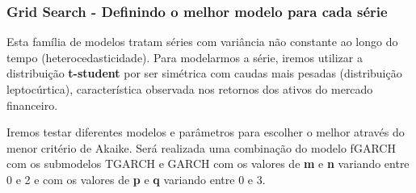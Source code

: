 \documentclass[
]{article}
\begin{document}
\hypertarget{grid-search---definindo-o-melhor-modelo-para-cada-suxe9rie}{%
\subsubsection{Grid Search - Definindo o melhor modelo para cada
série}\label{grid-search---definindo-o-melhor-modelo-para-cada-suxe9rie}}

Esta família de modelos tratam séries com variância não constante ao
longo do tempo (heterocedasticidade). Para modelarmos a série, iremos
utilizar a distribuição \textbf{t-student} por ser simétrica com caudas
mais pesadas (distribuição leptocúrtica), característica observada nos
retornos dos ativos do mercado financeiro.

Iremos testar diferentes modelos e parâmetros para escolher o melhor
através do menor critério de Akaike. Será realizada uma combinação do
modelo fGARCH com os submodelos TGARCH e GARCH com os valores de
\textbf{m} e \textbf{n} variando entre 0 e 2 e com os valores de
\textbf{p} e \textbf{q} variando entre 0 e 3.
\end{document}
